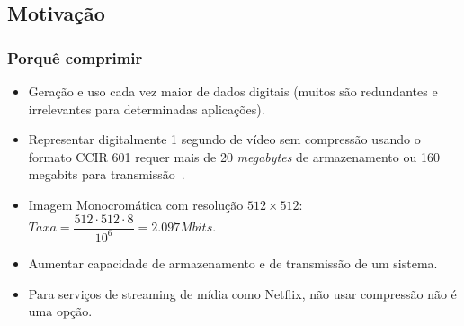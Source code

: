 \documentclass{beamer}
\begin{document}
\subsection{Motivação}
\begin{frame}
\frametitle{Porquê comprimir}
\begin{itemize}
    \item Geração e uso cada vez maior de dados digitais (muitos são redundantes e irrelevantes para determinadas aplicações).
    \item Representar digitalmente 1 segundo de vídeo sem compressão usando o formato CCIR 601 requer mais de 20 \textit{megabytes} de armazenamento ou 160 megabits para transmissão~\cite{book_compression}.
    \item Imagem Monocromática com resolução $512\times512$: $Taxa = \dfrac{512\cdot512\cdot8}{10^6} = 2.097 Mbits$.
    \item Aumentar capacidade de armazenamento e de transmissão de um sistema.
    \item Para serviços de streaming de mídia como Netflix, não usar compressão não é uma opção.
\end{itemize}
\end{frame}
\end{document}
